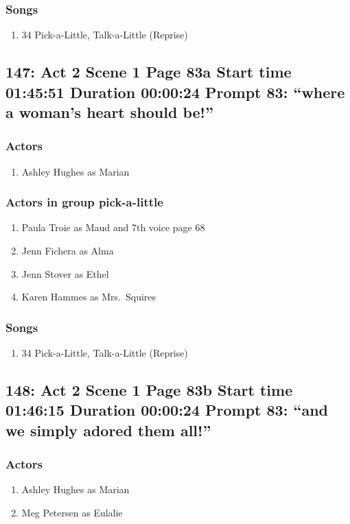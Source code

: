 \subsubsection{Songs}
\begin{enumerate}
\item 34 Pick-a-Little, Talk-a-Little (Reprise)
\end{enumerate}
\subsection{147: Act 2 Scene 1 Page 83a Start time 01:45:51 Duration 00:00:24 Prompt 83: ``where a woman's heart should be!''}

\subsubsection{Actors}
\begin{enumerate}
\item Ashley Hughes as Marian
\end{enumerate}
\subsubsection{Actors in group pick-a-little}
\begin{enumerate}
\item Paula Troie as Maud and 7th voice page 68
\item Jenn Fichera as Alma
\item Jenn Stover as Ethel
\item Karen Hammes as Mrs.~Squires
\end{enumerate}

\subsubsection{Songs}
\begin{enumerate}
\item 34 Pick-a-Little, Talk-a-Little (Reprise)
\end{enumerate}
\subsection{148: Act 2 Scene 1 Page 83b Start time 01:46:15 Duration 00:00:24 Prompt 83: ``and we simply adored them all!''}

\subsubsection{Actors}
\begin{enumerate}
\item Ashley Hughes as Marian
\item Meg Petersen as Eulalie
\end{enumerate}
